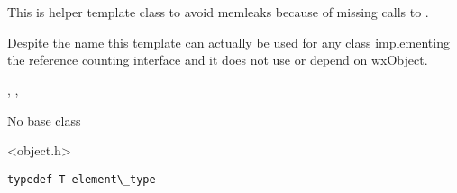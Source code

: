 \section{}\label{wxobjectdataptr}

This is helper template class to avoid memleaks because of missing calls
to .

Despite the name this template can actually be used for any
class implementing the reference counting interface and it
does not use or depend on wxObject.


,
,


No base class


<object.h>


{\small \begin{verbatim}
typedef T element\_type
\end{verbatim}}


